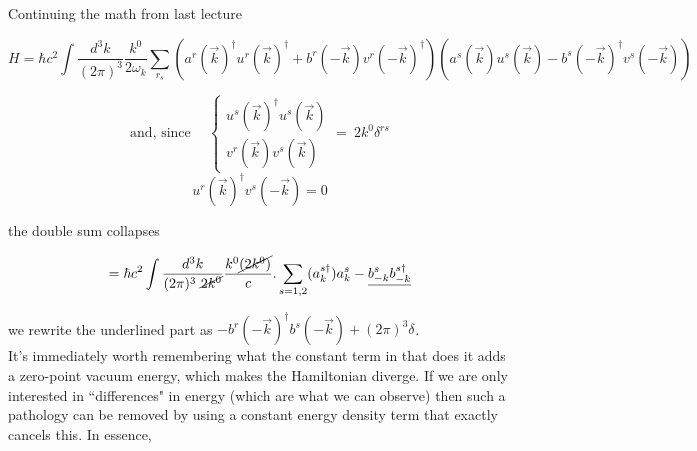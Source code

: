 \documentclass[11pt]{article}
\author{}
\title{}
\date{}
\begin{document}
	
	\pagestyle{fancy}
	\maketitle
	
	\vspace{-8em}
	
	
	\noindent
	
	\vspace{11pt}
	
	
	Continuing the math from last lecture
	
	\[ H = \hbar c^2 \int \frac{d^3 k}{(2\pi)^3} \frac{k^0}{2\omega_k} \sum_{r_s} (a^r(\vec{k})^\dagger u^r(\vec{k})^\dagger + b^r(-\vec{k})v^r(-\vec{k})^\dagger )(a^s(\vec{k})u^s(\vec{k}) - b^s(-\vec{k})^\dagger v^s(-\vec{k}))  \]
	
	
	\[ \text{and, since}\ \quad \begin{cases}
		u^s(\vec{k})^\dagger u^s (\vec{k}) \\
		v^r(\vec{k}) v^s(\vec{k}) 
	\end{cases} =\ 2k^0 \delta^{rs}
	\]
		\[u^r(\vec{k})^\dagger v^s(-\vec{k}) = 0\]
	
	the double sum collapses
	
	\[ = \hbar c^2 \int \frac{d^3k}{(2\pi)^3\ \cancel{2k^0}}\frac{k^0 \cancel{(2k^0)}}{c}
.		\sum_{s=1,2} (a^{s\dagger}_k)a^s_k - \underline{b^s_{-k} b_{-k}^{s\dagger}} \]
	
	we rewrite the underlined part as $-b^r(-\vec{k})^\dagger b^s(-\vec{k}) + (2\pi)^3\delta^{}$.\\
	
	It's immediately worth remembering what the constant term in that does \textemdash it adds a zero-point vacuum energy, which makes the Hamiltonian diverge. If we are only interested in ``differences" in energy (which are what we can observe) then such a pathology can be removed by using a constant energy density term that exactly cancels this. In essence,
	
\end{document}
